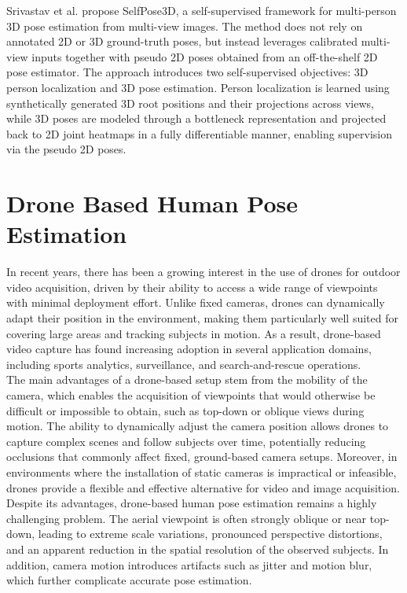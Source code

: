 Srivastav et al. \cite{srivastav2024selfpose3d} propose SelfPose3D, a self-supervised framework for multi-person 3D pose estimation from multi-view images. The method does not rely on annotated 2D or 3D ground-truth poses, but instead 
leverages calibrated multi-view inputs together with pseudo 2D poses obtained from an off-the-shelf 2D pose estimator. The approach introduces two self-supervised objectives: 3D person localization and 3D pose estimation. Person 
localization is learned using synthetically generated 3D root positions and their projections across views, while 3D poses are modeled through a bottleneck representation and projected back to 2D joint heatmaps in a fully 
differentiable manner, enabling supervision via the pseudo 2D poses.
\newpage


\section{Drone Based Human Pose Estimation}
In recent years, there has been a growing interest in the use of drones for outdoor video acquisition, driven by their ability to access a wide range of viewpoints with minimal deployment effort. Unlike fixed cameras, drones can 
dynamically adapt their position in the environment, making them particularly well suited for covering large areas and tracking subjects in motion. As a result, drone-based video capture has found increasing adoption in several 
application domains, including sports analytics, surveillance, and search-and-rescue operations.\\
The main advantages of a drone-based setup stem from the mobility of the camera, which enables the acquisition of viewpoints that would otherwise be difficult or impossible to obtain, such as top-down or oblique views during motion. 
The ability to dynamically adjust the camera position allows drones to capture complex scenes and follow subjects over time, potentially reducing occlusions that commonly affect fixed, ground-based camera setups. Moreover, in 
environments where the installation of static cameras is impractical or infeasible, drones provide a flexible and effective alternative for video and image acquisition.\\
Despite its advantages, drone-based human pose estimation remains a highly challenging problem. The aerial viewpoint is often strongly oblique or near top-down, leading to extreme scale variations, pronounced perspective distortions, 
and an apparent reduction in the spatial resolution of the observed subjects. In addition, camera motion introduces artifacts such as jitter and motion blur, which further complicate accurate pose estimation.
